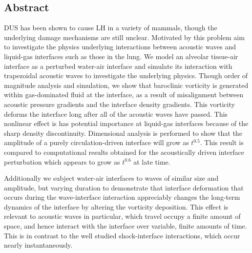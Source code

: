 \begin{center}
  \begin{minipage}{0.8\textwidth}
    \subsection*{Abstract}
    \ac{DUS} has been shown to cause \ac{LH} in a variety of mammals,
    though the underlying damage mechanisms are still
    unclear. Motivated by this problem aim to investigate the physics
    underlying interactions between acoustic waves and liquid-gas
    interfaces such as those in the lung. We model an alveolar
    tissue-air interface as a perturbed water-air interface and
    simulate its interaction with trapezoidal acoustic waves to
    investigate the underlying physics. Though order of magnitude
    analysis and simulation, we show that baroclinic vorticity is
    generated within gas-dominated fluid at the interface, as a result
    of misalignment between acoustic pressure gradients and the
    interface density gradients. This vorticity deforms the interface
    long after all of the acoustic waves have passed. This nonlinear
    effect is has potential importance at liquid-gas interfaces
    because of the sharp density discontinuity. Dimensional analysis
    is performed to show that the amplitude of a purely
    circulation-driven interface will grow as $t^{0.5}$. This result
    is compared to computational results obtained for the acoustically
    driven interface perturbation which appears to grow as
    $t^{0.6}$ at late time. \par
    
    \hspace*{4ex} Additionally we subject water-air interfaces to
    waves of similar size and amplitude, but varying duration to
    demonstrate that interface deformation that occurs during the
    wave-interface interaction appreciably changes the long-term
    dynamics of the interface by altering the vorticity
    deposition. This effect is relevant to acoustic waves in
    particular, which travel occupy a finite amount of space, and
    hence interact with the interface over variable, finite amounts of
    time. This is in contrast to the well studied shock-interface
    interactions, which occur nearly instantaneously.
  \end{minipage}
\end{center}
